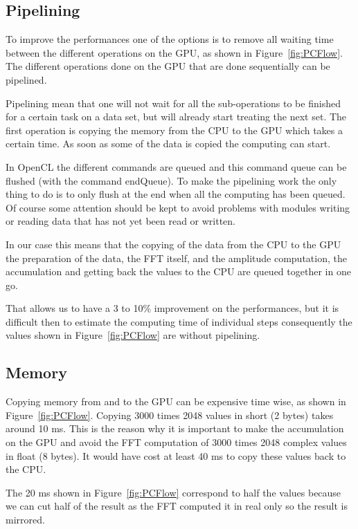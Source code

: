 \subsection{Pipelining}

To improve the performances one of the options is to remove all waiting time between the different operations on the \gls{GPU}, as shown in Figure~\ref{fig:PCFlow}. The different operations done on the \gls{GPU} that are done sequentially can be pipelined.

Pipelining mean that one will not wait for all the sub-operations to be finished for a certain task on a data set, but will already start treating the next set. The first operation is copying the memory from the \gls{CPU} to the \gls{GPU} which takes a certain time. As soon as some of the data is copied the computing can start.

In \gls{OpenCL} the different commands are queued and this command queue can be flushed (with the command endQueue). To make the pipelining work the only thing to do is to only flush at the end when all the computing has been queued. Of course some attention should be kept to avoid problems with modules writing or reading data that has not yet been read or written.

In our case this means that the copying of the data from the \gls{CPU} to the \gls{GPU} the preparation of the data, the \gls{FFT} itself, and the amplitude computation, the accumulation and getting back the values to the \gls{CPU} are queued together in one go.

That allows us to have a 3 to 10\% improvement on the performances, but it is difficult then to estimate the computing time of individual steps consequently the values shown in Figure~\ref{fig:PCFlow} are without pipelining.

\subsection{Memory}

Copying memory from and to the \gls{GPU} can be expensive time wise, as shown in Figure~\ref{fig:PCFlow}. Copying 3000 times 2048 values in short (2 bytes) takes around 10 ms. This is the reason why it is important to make the accumulation on the \gls{GPU} and avoid the \gls{FFT} computation of 3000 times 2048 complex values in float (8 bytes). It would have cost at least 40 ms to copy these values back to the \gls{CPU}. 

The 20 ms shown in Figure~\ref{fig:PCFlow} correspond to half the values because we can cut half of the result as the \gls{FFT} computed it in real only so the result is mirrored.

